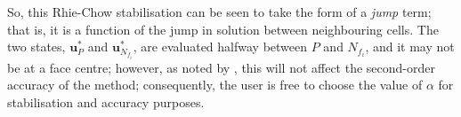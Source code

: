 \documentclass[sn-mathphys,Numbered]{sn-jnl}%
\newcommand{\bb}{\boldsymbol}
\begin{document}
So, this Rhie-Chow stabilisation can be seen to take the form of a \emph{jump} term; that is, it is a function of the jump in solution between neighbouring cells.
The two states, $\bb{u}_P^*$ and $\bb{u}_{N_{f_i}}^*$, are evaluated halfway between $P$ and $N_{f_i}$, and it may not be at a face centre; however, as noted by \citet{Nishikawa2010}, this will not affect the second-order accuracy of the method; consequently, the user is free to choose the value of $\alpha$ for stabilisation and accuracy purposes.





%
%
\end{document}
